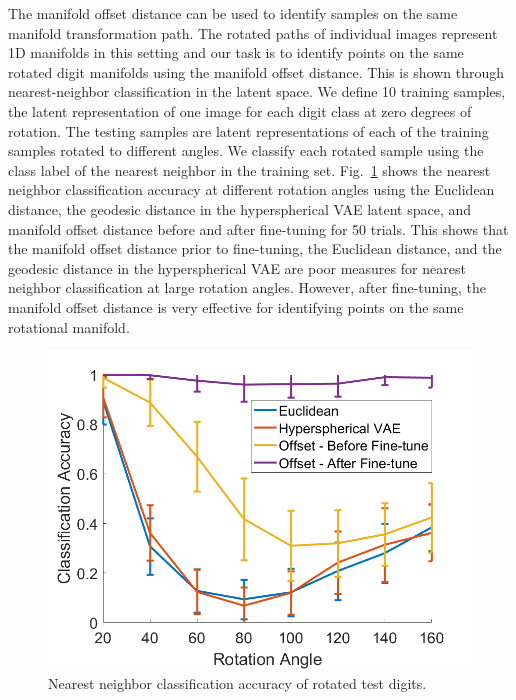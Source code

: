 \documentclass[letterpaper]{article} %
\begin{document}
The manifold offset distance can be used to identify samples on the same manifold transformation path. The rotated paths of individual images represent 1D manifolds in this setting and our task is to identify points on the same rotated digit manifolds using the manifold offset distance. This is shown through nearest-neighbor classification in the latent space. We define 10 training samples, the latent representation of one image for each digit class at zero degrees of rotation. The testing samples are latent representations of each of the training samples rotated to different angles. We classify each rotated sample using the class label of the nearest neighbor in the training set. Fig.~\ref{fig:kNNFig} shows the nearest neighbor classification accuracy at different rotation angles using the Euclidean distance, the geodesic distance in the hyperspherical VAE latent space, and manifold offset distance before and after fine-tuning for 50 trials. This shows that the manifold offset distance prior to fine-tuning, the Euclidean distance, and the geodesic distance in the hyperspherical VAE are poor measures for nearest neighbor classification at large rotation angles. However, after fine-tuning, the manifold offset distance is very effective for identifying points on the same rotational manifold.

\begin{figure}[t]
\centering

\includegraphics[width=0.8\columnwidth]{kNNAcc_hvae.png}

\caption{\label{fig:kNNFig} Nearest neighbor classification accuracy of rotated test digits. }

\end{figure}
\end{document}
